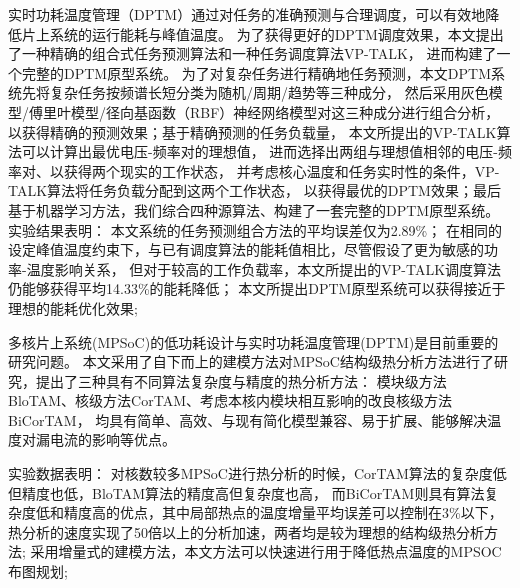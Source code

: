 


\makeatother



\begin{cabstract}

  实时功耗温度管理（DPTM）通过对任务的准确预测与合理调度，可以有效地降低片上系统的运行能耗与峰值温度。 为了获得更好的DPTM调度效果，本文提出了一种精确的组合式任务预测算法和一种任务调度算法VP-TALK， 进而构建了一个完整的DPTM原型系统。 为了对复杂任务进行精确地任务预测，本文DPTM系统先将复杂任务按频谱长短分类为随机/周期/趋势等三种成分， 然后采用灰色模型/傅里叶模型/径向基函数（RBF）神经网络模型对这三种成分进行组合分析， 以获得精确的预测效果；基于精确预测的任务负载量， 本文所提出的VP-TALK算法可以计算出最优电压-频率对的理想值， 进而选择出两组与理想值相邻的电压-频率对、以获得两个现实的工作状态， 并考虑核心温度和任务实时性的条件，VP-TALK算法将任务负载分配到这两个工作状态， 以获得最优的DPTM效果；最后基于机器学习方法，我们综合四种源算法、构建了一套完整的DPTM原型系统。 
  实验结果表明：
  本文系统的任务预测组合方法的平均误差仅为2.89\%；
  在相同的设定峰值温度约束下，与已有调度算法的能耗值相比，尽管假设了更为敏感的功率-温度影响关系， 但对于较高的工作负载率，本文所提出的VP-TALK调度算法仍能够获得平均14.33\%的能耗降低；
  本文所提出DPTM原型系统可以获得接近于理想的能耗优化效果;


  多核片上系统(MPSoC)的低功耗设计与实时功耗温度管理(DPTM)是目前重要的研究问题。 本文采用了自下而上的建模方法对MPSoC结构级热分析方法进行了研究，提出了三种具有不同算法复杂度与精度的热分析方法： 模块级方法BloTAM、核级方法CorTAM、考虑本核内模块相互影响的改良核级方法BiCorTAM， 均具有简单、高效、与现有简化模型兼容、易于扩展、能够解决温度对漏电流的影响等优点。 
  
  实验数据表明：
  对核数较多MPSoC进行热分析的时候，CorTAM算法的复杂度低但精度也低，BloTAM算法的精度高但复杂度也高， 而BiCorTAM则具有算法复杂度低和精度高的优点，其中局部热点的温度增量平均误差可以控制在3\%以下， 热分析的速度实现了50倍以上的分析加速，两者均是较为理想的结构级热分析方法;
  采用增量式的建模方法，本文方法可以快速进行用于降低热点温度的MPSOC布图规划;


\end{cabstract}

